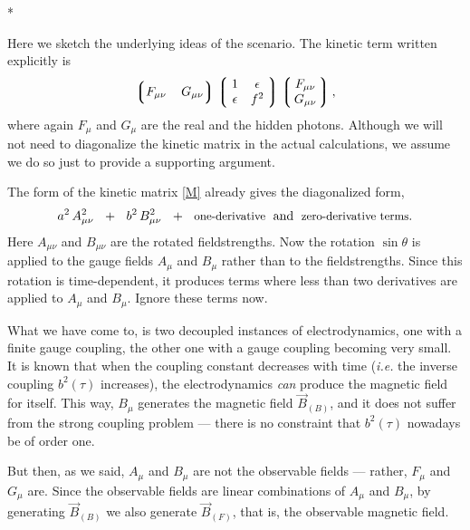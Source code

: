 \documentclass[12pt]{article}
\def\beq{\begin{equation}}
\def\eeq{\end{equation}}
\newcommand{\lgr}{\left\lgroup}
\newcommand{\rgr}{\right\rgroup}
\begin{document}
	
\vspace{1.0cm}
\centerline{*\qquad\qquad\qquad*\qquad\qquad\qquad*}
\vspace{1.0cm}

	Here we sketch the underlying ideas of the scenario.
	The kinetic term written explicitly is
\beq
	\lgr F_{\mu\nu}\, \quad G_{\mu\nu} \rgr 
	\lgr\; \begin{matrix}
				1          &    \epsilon  \\
				\epsilon   &    f^2
	\end{matrix} \;\rgr
	\lgr\, \begin{matrix}
		F_{\mu\nu}  \\
		G_{\mu\nu}
	     \end{matrix} \,\rgr,
\eeq
	where again $ F_{\mu} $ and $ G_{\mu} $ are the real and the hidden photons.
	Although we will not need to diagonalize the kinetic matrix in the actual calculations, 
	we assume we do so just to provide a supporting argument.

	The form of the kinetic matrix \eqref{M} already gives the diagonalized form,
\beq
\label{diag}
	a^2\, A_{\mu\nu}^2  ~~+~~  b^2\, B_{\mu\nu}^2  ~~+~~  \text{{\small one-derivative} \;and\; {\small zero-derivative terms}.}
\eeq
	Here $ A_{\mu\nu} $ and $ B_{\mu\nu} $ are the rotated fieldstrengths.
	Now the rotation $ \sin \theta $ is applied to the gauge fields $ A_\mu $ and $ B_\mu $ rather than
	to the fieldstrengths.
	Since this rotation is time-dependent, it produces terms where less than two derivatives 
	are applied to $ A_{\mu} $ and $ B_{\mu} $.
	Ignore these terms now.

	What we have come to, is two decoupled instances of electrodynamics, one with a finite gauge coupling,
	the other one with a gauge coupling becoming very small.
	It is known that when the coupling constant decreases with time ({\it i.e.} the inverse coupling $ b^2(\tau) $ increases),
	the electrodynamics {\it can} produce the magnetic field for itself.
	This way, $ B_{\mu} $ generates the magnetic field $ \vec{B}_{(B)} $, 
	and it does not suffer from the strong coupling problem ---
	there is no constraint that $ b^2(\tau) $ nowadays be of order one. 

	But then, as we said, $ A_\mu $ and $ B_\mu $ are not the observable fields --- 
	rather, $ F_\mu $ and $ G_\mu $ are.
	Since the observable fields are linear combinations of $ A_\mu $ and $ B_\mu $, 
	by generating $ \vec{B}_{(B)} $ we also generate $ \vec{B}_{(F)} $, 
	that is, the observable magnetic field.
\end{document}
